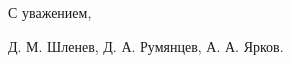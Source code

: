 \documentclass[14pt, russian]{article}
\def\mprl{\mbox{\tiny $\|$}}
\newcommand{\ii}{\mathrm{i}} %
\begin{document}
\vspace{5mm}
С уважением,

Д. М. Шленев, Д. А. Румянцев, А. А. Ярков.
%
%
%
%
%
%
\end{document}
